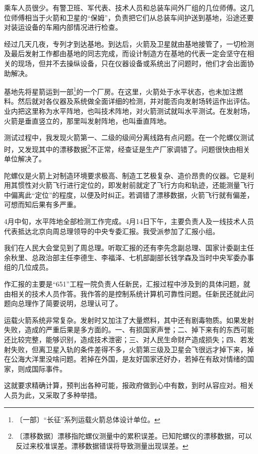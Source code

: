\documentclass[12pt,UTF-8,openany]{ctexbook}
\begin{document}
\begin{normalsize}
    乘车人员很少。有警卫班、军代表、技术人员和总装车间外厂组的几位师傅。这几位师傅相当于火箭和卫星的“保姆”，负责把它们从总装车间护送到基地，沿途还要对装运设备的车厢内部情况进行检查。
    
    经过几天几夜，专列才到达基地。到达后，火箭及卫星就由基地接管了，一切检测及最后发射工作都由基地的同志完成，而设计制造方在基地的代表一定会坚守在相关的现场，但并不去操纵设备，只在仪器设备或系统出了问题时，他们才会出面协助解决。
    
    基地先将星箭运到一部\footnote{〔一部〕“长征”系列运载火箭总体设计单位。}的一个厂房。在这里，火箭处于水平状态，也未加注燃料。然后就对各仪器及系统做全面详细的检测，并对能否向发射场转运作出评估。业内把这里称为水平阵地，也叫技术阵地，对火箭测试就叫水平测试。在发射场，火箭是垂直竖立的，那里叫发射阵地，也叫垂直阵地。
    
    测试过程中，我发现火箭第一、二级的级间分离线路有点问题。在一个陀螺仪测试时，又发现其中的漂移数据\footnote{〔漂移数据〕漂移指陀螺仪测量中的累积误差。已知陀螺仪的漂移数据，可以反过来校准误差。漂移数据错误将导致测量出现误差。}不正常，经查证是生产厂家调错了。问题很快由相关单位解决了。
    
    陀螺仪是火箭上对制造环境要求极高、制造工艺极复杂、造价昂贵的仪器。它是利用其惯性对火箭飞行进行定位的，即发射前就定了飞行方向和轨迹，还能测量飞行中偏离此“定位”的程度，以便及时纠正。若调错了漂移数据，火箭飞行就有偏差，可想而知后果有多严重。
    
    4月中旬，水平阵地全部检测工作完成。4月14日下午，主要负责人及一线技术人员代表抵达北京向周总理领导的中央专委汇报。我受派参加了汇报小组。
    
    我们在人民大会堂见到了周总理。听取汇报的还有李先念副总理、国家计委副主任余秋里、总政治部主任李德生、李福泽、七机部副部长钱学森及当时中央军委办事组的几位成员。
    
    作汇报的主要是“651”工程一院负责人任新民，汇报过程中涉及到的具体问题，就由相关的技术人员作答。我作答的是控制系统计算机可靠性问题。任新民还就此问题向总理作了简要说明，总理认可了。
    
    运载火箭系统非常复杂。发射时又加注了大量燃料，其中还有剧毒物质。如果发射失败，造成的严重后果是多方面的。一、有损国家声誉；二、掉下来有的东西可能还比较完整，能够识别，造成技术泄密；三、对人民生命财产造成损失；四、若发射失败，但离卫星入轨的条件差得不多，火箭第三级及卫星会飞很远才掉下来，掉在公海大洋里没啥问题。若掉在外国，是友好国家还好办，若掉在有敌对情绪的国家，则成国际事件。
    
    这就要求精确计算，预判出各种可能，报政府做到心中有数，到时从容应对。相关人员为此，又采取了多种举措。
    

\end{normalsize}
\end{document}

